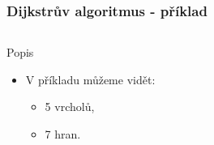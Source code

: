 \documentclass{beamer}
\begin{document}
\begin{frame}
    \frametitle{Dijkstrův algoritmus - příklad}
    \begin{columns}
        \begin{block}{Popis}
            \begin{itemize}
            \item V příkladu můžeme vidět:
            \begin{itemize}
                \item 5 vrcholů,
                \item 7 hran.
            \end{itemize}
            \end{itemize}
        \end{block}
    \end{columns}
\end{frame}
\end{document}
